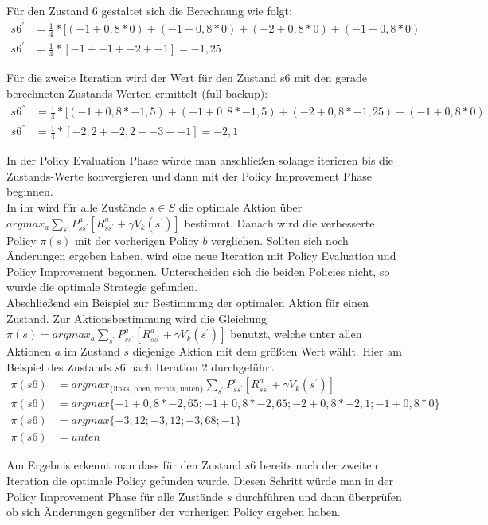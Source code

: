 \documentclass[10pt]{scrartcl}
\begin{document}
Für den Zustand 6 gestaltet sich die Berechnung wie folgt:
\begin{align}
	s6^{'} &= \frac{1}{4} * [(-1 + 0,8 * 0) + (-1 + 0,8 * 0) + (-2 + 0,8 * 0) + (-1 + 0,8 * 0)\\
	s6^{'} &= \frac{1}{4} * [ -1 + -1 + -2 + -1 ] = -1,25
\end{align}

Für die zweite Iteration wird der Wert für den Zustand s6 mit den gerade berechneten Zustands-Werten ermittelt (full backup):
\begin{align}
	s6^{''} &= \frac{1}{4} * [(-1 + 0,8 * -1,5) + (-1 + 0,8 * -1,5) + (-2 + 0,8 * -1,25) + (-1 + 0,8 * 0)\\
	s6^{''} &= \frac{1}{4} * [ -2,2 + -2,2 + -3 + -1 ] = -2,1
\end{align}

In der Policy Evaluation Phase würde man anschließen solange iterieren bis die Zustands-Werte konvergieren und dann mit der Policy Improvement Phase beginnen.\\
In ihr wird für alle Zustände $s \in S$ die optimale Aktion über 
$argmax_{a} \sum_{s^{'}} P^a_{ss^{'}} [R^a_{ss^{'}} + \gamma V_{k} (s^{'})]$ bestimmt. 
Danach wird die verbesserte Policy $\pi(s)$ mit der vorherigen Policy $b$ verglichen.
Sollten sich noch Änderungen ergeben haben, wird eine neue Iteration mit Policy Evaluation und Policy Improvement begonnen.
Unterscheiden sich die beiden Policies nicht, so wurde die optimale Strategie gefunden.\\

Abschließend ein Beispiel zur Bestimmung der optimalen Aktion für einen Zustand. Zur Aktionsbestimmung wird die Gleichung $\pi(s) = argmax_{a} \sum_{s^{'}} P^a_{ss^{'}} [R^a_{ss^{'}} + \gamma V_{k} (s^{'})]$ benutzt, welche unter allen Aktionen $a$ im Zustand $s$ diejenige Aktion mit dem größten Wert wählt. Hier am Beispiel des Zustands $s6$ nach Iteration 2 durchgeführt:
\begin{align}
	\pi(s6) &= argmax_{\text{\{links, oben, rechts, unten\}}} \sum_{s^{'}} P^a_{ss^{'}} [R^a_{ss^{'}} + \gamma V_{k} (s^{'})]\\	
	\pi(s6) &= argmax \{ -1 + 0,8 * -2,65; -1 + 0,8 * -2,65; -2 + 0,8 * -2,1; -1 + 0,8 * 0 \}\\
	\pi(s6) &= argmax \{ -3,12; -3,12; -3,68; -1 \}\\
	\pi(s6) &= unten
\end{align}

Am Ergebnis erkennt man dass für den Zustand $s6$ bereits nach der zweiten Iteration die optimale Policy gefunden wurde.
Diesen Schritt würde man in der Policy Improvement Phase für alle Zustände $s$ durchführen und dann überprüfen ob sich Änderungen gegenüber der vorherigen Policy ergeben haben.
\end{document}
